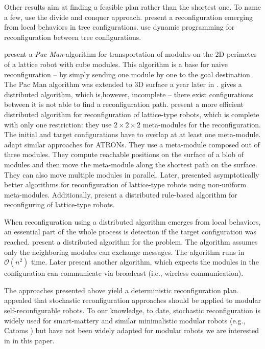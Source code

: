 Other results aim at finding a feasible plan rather than the shortest one. To
name a few, \textcite{10.1117/12.360345} use the divide and conquer approach.
\textcite{DBLP:conf/icra/HouS08} present a reconfiguration emerging from local
behaviors in tree configurations. \textcite{DBLP:journals/ral/LiuWY19} use
dynamic programming for reconfiguration between tree configurations.

\textcite{DBLP:conf/iros/ButlerBR01} present a \emph{Pac Man} algorithm for
transportation of modules on the 2D perimeter of a lattice robot with cube
modules. This algorithm is a base for naive reconfiguration -- by simply sending
one module by one to the goal destination. The Pac Man algorithm was extended to
3D surface a year later in \cite{DBLP:conf/wafr/ButlerR02}.
\textcite{DBLP:journals/dc/WalterWA00} gives a distributed algorithm, which
is,however, incomplete -- there exist configurations between it is not able to
find a reconfiguration path. \textcite{DBLP:conf/icra/VassilvitskiiYS02} present
a more efficient distributed algorithm for reconfiguration of lattice-type
robots, which is complete with only one restriction: they use $2\times2\times2$
meta-modules for the reconfiguration. The initial and target configurations have
to overlap at at least one meta-module.
\textcite{DBLP:conf/ieeealife/Christensen07} adapt similar approaches for
ATRONs. They use a meta-module composed out of three modules. They compute
reachable positions on the surface of a blob of modules and then move the
meta-module along the shortest path on the surface. They can also move multiple
modules in parallel. Later, \textcite{DBLP:journals/comgeo/AloupisBDDFIW13}
presented asymptotically better algorithms for reconfiguration of lattice-type
robots using non-uniform meta-modules. Additionally,
\textcite{DBLP:conf/pdp/PirandaB16} present a distributed rule-based algorithm
for reconfiguring of lattice-type robots.

When reconfiguration using a distributed algorithm emerges from local behaviors,
an essential part of the whole process is detection if the target configuration
was reached. \textcite{DBLP:conf/icra/ButlerFRW02} present a distributed
algorithm for the problem. The algorithm assumes only the neighboring modules
can exchange messages. The algorithm runs in $\mathcal{O}(n^2)$ time. Later
\textcite{DBLP:journals/ras/BacaWDN17} present another algorithm, which expects
the modules in the configuration can communicate via broadcast (i.e., wireless
communication).

The approaches presented above yield a deterministic reconfiguration plan.
\textcite{4141032} appealed that stochastic reconfiguration approaches should be
applied to modular self-reconfigurable robots. To our knowledge, to date,
stochastic reconfiguration is widely used for smart-mattery and similar
minimalistic modular robots (e.g., Catoms \cite{DBLP:conf/aaai/KirbyCAPHMG05})
but have not been widely adapted for  modular robots we are
interested in in this paper.

